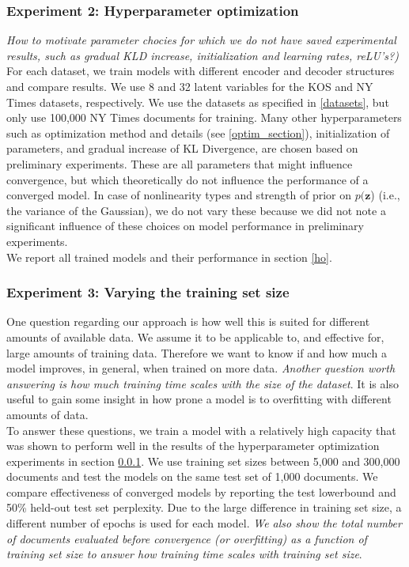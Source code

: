 \documentclass{report}
\begin{document}
	\subsubsection{Experiment 2: Hyperparameter optimization}\label{HO_section}
	\textit{How to motivate parameter chocies for which we do not have saved experimental results, such as gradual KLD increase, initialization and learning rates, reLU's?)}
	For each dataset, we train models with different encoder and decoder structures and compare results. We use 8 and 32 latent variables for the KOS and NY Times datasets, respectively. We use the datasets as specified in \ref{datasets}, but only use 100,000 NY Times documents for training. Many other hyperparameters such as optimization method and details (see \ref{optim_section}), initialization of parameters, and gradual increase of KL Divergence, are chosen based on preliminary experiments. These are all parameters that might influence convergence, but which theoretically do not influence the performance of a converged model. In case of nonlinearity types and strength of prior on $p(\mathbf{z}$) (i.e., the variance of the Gaussian), we do not vary these because we did not note a significant influence of these choices on model performance in preliminary experiments.\\
	We report all trained models and their performance in section \ref{ho}.
	
	
	\subsubsection{Experiment 3: Varying the training set size}
	One question regarding our approach is how well this is suited for different amounts of available data. We assume it to be applicable to, and effective for, large amounts of training data. Therefore we want to know if and how much a model improves, in general, when trained on more data. \textit{Another question worth answering is how much training time scales with the size of the dataset}. It is also useful to gain some insight in how prone a model is to overfitting with different amounts of data.\\
	To answer these questions, we train a model with a relatively high capacity that was shown to perform well in the results of the hyperparameter optimization experiments in section \ref{HO_section}. We use training set sizes between 5,000 and 300,000 documents and test the models on the same test set of 1,000 documents. We compare effectiveness of converged models by reporting the test lowerbound and 50\% held-out test set perplexity. Due to the large difference in training set size, a different number of epochs is used for each model. \textit{We also show the total number of documents evaluated before convergence (or overfitting) as a function of training set size to answer how training time scales with training set size}.
\end{document}
